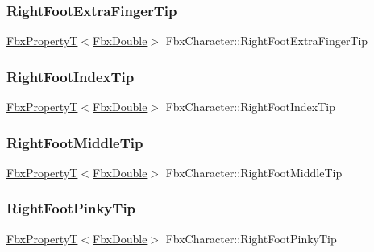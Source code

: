 \subsubsection{\texorpdfstring{Right\+Foot\+Extra\+Finger\+Tip}{RightFootExtraFingerTip}}
{\footnotesize\ttfamily \hyperlink{class_fbx_property_t}{Fbx\+PropertyT}$<$\hyperlink{fbxtypes_8h_a171e72a1c46fc15c1a6c9c31948c1c5b}{Fbx\+Double}$>$ Fbx\+Character\+::\+Right\+Foot\+Extra\+Finger\+Tip}

\mbox{\label{class_fbx_character_a174b601c330f92ed0bf0e5e321ec48ad}} 
\subsubsection{\texorpdfstring{Right\+Foot\+Index\+Tip}{RightFootIndexTip}}
{\footnotesize\ttfamily \hyperlink{class_fbx_property_t}{Fbx\+PropertyT}$<$\hyperlink{fbxtypes_8h_a171e72a1c46fc15c1a6c9c31948c1c5b}{Fbx\+Double}$>$ Fbx\+Character\+::\+Right\+Foot\+Index\+Tip}

\mbox{\label{class_fbx_character_a3804bbcc2d3f2bd87ce7c88cada6618b}} 
\subsubsection{\texorpdfstring{Right\+Foot\+Middle\+Tip}{RightFootMiddleTip}}
{\footnotesize\ttfamily \hyperlink{class_fbx_property_t}{Fbx\+PropertyT}$<$\hyperlink{fbxtypes_8h_a171e72a1c46fc15c1a6c9c31948c1c5b}{Fbx\+Double}$>$ Fbx\+Character\+::\+Right\+Foot\+Middle\+Tip}

\mbox{\label{class_fbx_character_a180d0cf795cda71d5447d443f28c50bd}} 
\subsubsection{\texorpdfstring{Right\+Foot\+Pinky\+Tip}{RightFootPinkyTip}}
{\footnotesize\ttfamily \hyperlink{class_fbx_property_t}{Fbx\+PropertyT}$<$\hyperlink{fbxtypes_8h_a171e72a1c46fc15c1a6c9c31948c1c5b}{Fbx\+Double}$>$ Fbx\+Character\+::\+Right\+Foot\+Pinky\+Tip}

